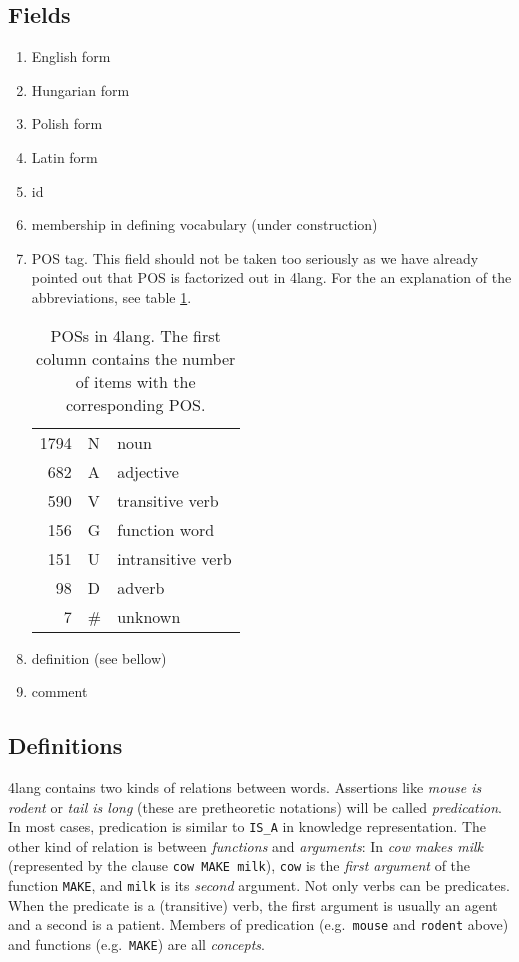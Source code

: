 \documentclass[a4paper,10pt]{article}
\begin{document}
\subsection{Fields}
\begin{enumerate}
 \item English form
\item Hungarian form
\item Polish form
\item Latin form
\item id
\item membership in defining vocabulary (under construction)
\item POS tag. This field should not be taken too seriously as we have already pointed out that POS is factorized out in 4lang. For the an explanation of the abbreviations, see table \ref{table_pos}.
\begin{table}[h]
\begin{center}
\begin{tabular}{rll}
\toprule 
1794	& N & noun
\\ 682	& A & adjective
\\ 590	& V & transitive verb
\\ 156	& G & function word
\\ 151	& U & intransitive verb
\\ 98	& D & adverb
\\ 7	& \# & unknown
\\\bottomrule
\end{tabular}
\end{center}
\caption{POSs in 4lang. The first column contains the number of items with the corresponding POS.}
\label{table_pos}
\end{table}
\item definition (see bellow)
\item comment
\end{enumerate}
\subsection{Definitions}
4lang contains two kinds of relations between words. Assertions like \emph{mouse is rodent} or \emph{tail is long} (these are pretheoretic notations) will be called \emph{predication}. In most cases, predication is similar to \texttt{IS\_A} in knowledge representation. The other kind of relation is between \emph{functions} and \emph{arguments}: In \emph{cow makes milk} (represented by the clause \texttt{cow MAKE milk}), \texttt{cow} is the \emph{first argument} of the function \texttt{MAKE}, and \texttt{milk} is its \emph{second} argument. Not only verbs can be predicates. When the predicate is a (transitive) verb, the first argument is usually an agent and a second is a patient. Members of predication (e.g.\ \texttt{mouse} and \texttt{rodent} above) and functions (e.g.\ \texttt{MAKE}) are all \emph{concepts}.
\end{document}
